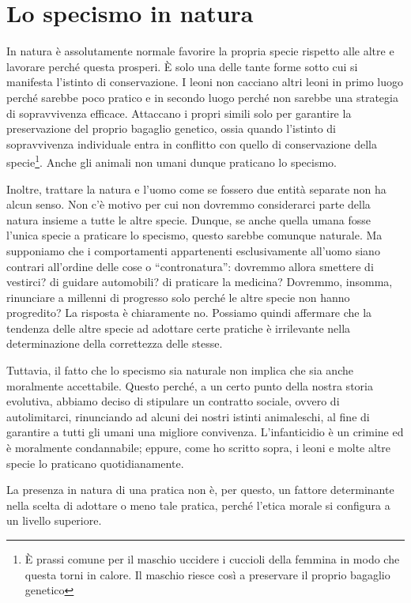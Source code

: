 \documentclass[a4paper,11pt,oneside,article]{memoir}
\begin{document}
\chapter{Lo specismo in natura}

In natura è assolutamente normale favorire la propria specie rispetto alle altre
e lavorare perché questa prosperi. È solo una delle tante forme sotto cui si
manifesta l'istinto di conservazione. I leoni non cacciano altri leoni in primo
luogo perché sarebbe poco pratico e in secondo luogo perché non sarebbe una
strategia di sopravvivenza efficace. Attaccano i propri simili solo per
garantire la preservazione del proprio bagaglio genetico, ossia quando l'istinto
di sopravvivenza individuale entra in conflitto con quello di conservazione
della specie\footnote{È prassi comune per il maschio uccidere i cuccioli della
femmina in modo che questa torni in calore. Il maschio riesce così a preservare
il proprio bagaglio genetico}. Anche gli animali non umani dunque praticano lo
specismo.

Inoltre, trattare la natura e l'uomo come se fossero due entità separate non ha
alcun senso. Non c'è motivo per cui non dovremmo considerarci parte della natura
insieme a tutte le altre specie. Dunque, se anche quella umana fosse l'unica
specie a praticare lo specismo, questo sarebbe comunque naturale. Ma supponiamo
che i comportamenti appartenenti esclusivamente all'uomo siano contrari
all'ordine delle cose o ``contronatura'': dovremmo allora smettere di vestirci?
di guidare automobili? di praticare la medicina? Dovremmo, insomma, rinunciare a
millenni di progresso solo perché le altre specie non hanno progredito? La
risposta è chiaramente no. Possiamo quindi affermare che la tendenza delle altre
specie ad adottare certe pratiche è irrilevante nella determinazione della
correttezza delle stesse.

Tuttavia, il fatto che lo specismo sia naturale non implica che sia anche
moralmente accettabile. Questo perché, a un certo punto della nostra storia
evolutiva, abbiamo deciso di stipulare un contratto sociale, ovvero di
autolimitarci, rinunciando ad alcuni dei nostri istinti animaleschi, al fine di
garantire a tutti gli umani una migliore convivenza. L'infanticidio è un crimine
ed è moralmente condannabile; eppure, come ho scritto sopra, i leoni e molte
altre specie lo praticano quotidianamente.

La presenza in natura di una pratica non è, per questo, un fattore determinante
nella scelta di adottare o meno tale pratica, perché l'etica morale si configura
a un livello superiore.
\end{document}
